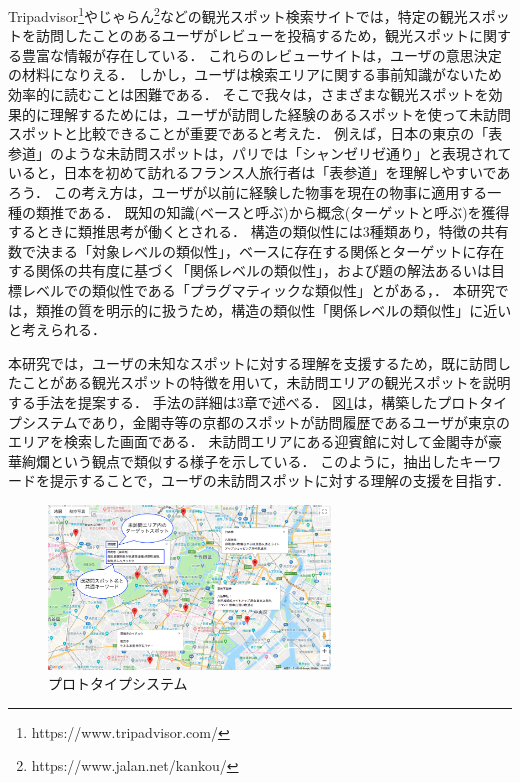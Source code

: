 \documentclass[submit]{ipsj}
\begin{document}
Tripadvisor\footnote{https://www.tripadvisor.com/}やじゃらん\footnote{https://www.jalan.net/kankou/}などの観光スポット検索サイトでは，特定の観光スポットを訪問したことのあるユーザがレビューを投稿するため，観光スポットに関する豊富な情報が存在している．
これらのレビューサイトは，ユーザの意思決定の材料になりえる．
しかし，ユーザは検索エリアに関する事前知識がないため効率的に読むことは困難である．
そこで我々は，さまざまな観光スポットを効果的に理解するためには，ユーザが訪問した経験のあるスポットを使って未訪問スポットと比較できることが重要であると考えた．
例えば，日本の東京の「表参道」のような未訪問スポットは，パリでは「シャンゼリゼ通り」と表現されていると，日本を初めて訪れるフランス人旅行者は「表参道」を理解しやすいであろう．
この考え方は，ユーザが以前に経験した物事を現在の物事に適用する一種の類推である．
既知の知識(ベースと呼ぶ)から概念(ターゲットと呼ぶ)を獲得するときに類推思考が働くとされる\cite{Codd01}．
構造の類似性には3種類あり，特徴の共有数で決まる「対象レベルの類似性」，ベースに存在する関係とターゲットに存在する関係の共有度に基づく「関係レベルの類似性」，および題の解法あるいは目標レベルでの類似性である「プラグマティックな類似性」とがある\cite{Codd01}，\cite{Codd02}．
本研究では，類推の質を明示的に扱うため，構造の類似性「関係レベルの類似性」に近いと考えられる．

本研究では，ユーザの未知なスポットに対する理解を支援するため，既に訪問したことがある観光スポットの特徴を用いて，未訪問エリアの観光スポットを説明する手法を提案する．
手法の詳細は3章で述べる．
図\ref{fig:Photo_Map}は，構築したプロトタイプシステムであり，金閣寺等の京都のスポットが訪問履歴であるユーザが東京のエリアを検索した画面である．
未訪問エリアにある迎賓館に対して金閣寺が豪華絢爛という観点で類似する様子を示している．
このように，抽出したキーワードを提示することで，ユーザの未訪問スポットに対する理解の支援を目指す．

\begin{figure}[t]
  \begin{center}
    \includegraphics[clip,width=7.5cm]{picture/Photo_Map2_jap.png}
    \caption{プロトタイプシステム}
    \label{fig:Photo_Map}
   \end{center}
\end{figure}
\end{document}
